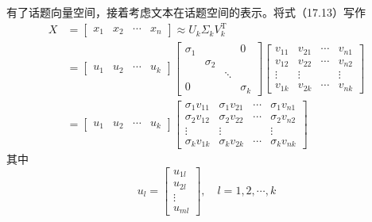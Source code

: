 \documentclass[UTF8,12pt,a4paper,fontset=fandol]{ctexart}
\begin{document}
有了话题向量空间，接着考虑文本在话题空间的表示。将式（17.13）写作
\begin{equation}
\begin{aligned}
X&=
\begin{bmatrix}
x_1 & x_2 & \cdots & x_n
\end{bmatrix}
\approx U_k\Sigma_kV_k^{\mathrm{T}}\\
&=
\begin{bmatrix}
u_1 & u_2 & \cdots & u_k
\end{bmatrix}
\begin{bmatrix}
\sigma_1 & & & 0\\
& \sigma_2 & & \\
& & \ddots & \\
0 & & & \sigma_k
\end{bmatrix}
\begin{bmatrix}
v_{11} & v_{21} & \cdots & v_{n1}\\
v_{12} & v_{22} & \cdots & v_{n2}\\
\vdots & \vdots & & \vdots\\
v_{1k} & v_{2k} & \cdots & v_{nk}
\end{bmatrix}\\
&=
\begin{bmatrix}
u_1 & u_2 & \cdots & u_k
\end{bmatrix}
\begin{bmatrix}
\sigma_1 v_{11} & \sigma_1 v_{21} & \cdots & \sigma_1 v_{n1}\\
\sigma_2 v_{12} & \sigma_2 v_{22} & \cdots & \sigma_2 v_{n2}\\
\vdots & \vdots & & \vdots\\
\sigma_k v_{1k} & \sigma_k v_{2k} & \cdots & \sigma_k v_{nk}
\end{bmatrix}
\end{aligned}
\tag{17.14}
\end{equation}
其中
\[
u_l=
\begin{bmatrix}
u_{1l}\\
u_{2l}\\
\vdots\\
u_{ml}
\end{bmatrix},
\quad l=1,2,\cdots,k
\]
\end{document}
